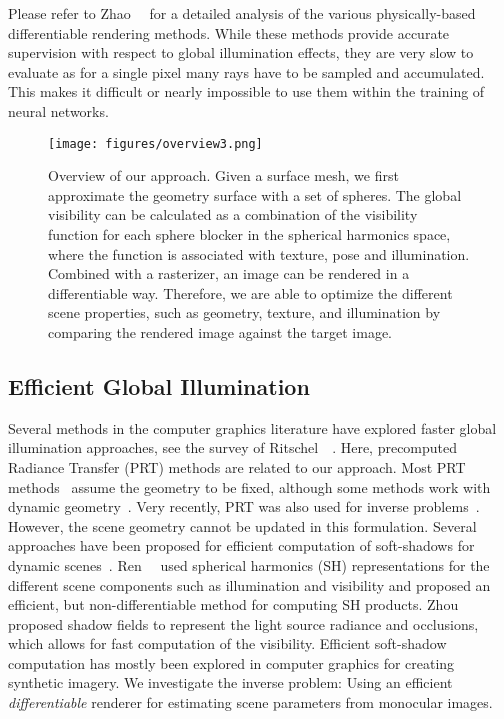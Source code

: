 %
Please refer to Zhao~\etal~\cite{pbr_tut} for a detailed analysis of the various physically-based differentiable rendering methods.
%
While these methods provide accurate supervision with respect to global illumination effects, they are very slow to evaluate as for a single pixel many rays have to be sampled and accumulated. 
%
This makes it difficult or nearly impossible to use them within the training of neural networks.
%
%
\begin{figure*}[t]
\centering
%
\texttt{[image: figures/overview3.png]} 
%
\caption
{
Overview of our approach. 
%
Given a surface mesh, we first approximate the geometry surface with a set of spheres.
%
The global visibility can be calculated as a combination of the visibility function for each sphere blocker in the spherical harmonics space, where the function is associated with texture, pose and illumination.
%
Combined with a rasterizer, an image can be rendered in a differentiable way. 
%
Therefore, we are able to optimize the different scene properties, such as geometry, texture, and illumination by comparing the rendered image against the target image.
%
}
%
\label{fig:overview}
%
\end{figure*}
%
%
\subsection{Efficient Global Illumination}
%
Several methods in the computer graphics literature have explored faster global illumination approaches, see the survey of Ritschel~\etal~\cite{ritschel2012state}.
%
Here, precomputed Radiance Transfer (PRT) methods are related to our approach. 
%
Most PRT methods~\cite{dobashi1995quick,sloan2002precomputed,kautz2002fast} assume the geometry to be fixed, although some methods work with dynamic geometry~\cite{sloan2005local,iwasaki2007precomputed}. 
%
Very recently, PRT was also used for inverse problems~\cite{thul2020precomputed}. 
%
However, the scene geometry cannot be updated in this formulation.
%
Several approaches have been proposed for efficient computation of soft-shadows for dynamic scenes~\cite{kautz2004hemispherical,zhou2005precomputed,kontkanen2005ambient}.
%
Ren~\etal ~\cite{ren2006real} used spherical harmonics (SH) representations for the different scene components such as illumination and visibility and proposed an efficient, but non-differentiable method for computing SH products.
%
Zhou ~\etal ~\cite{zhou2005precomputed} proposed shadow fields to represent the light source radiance and occlusions, which allows for fast computation of the visibility. 
%
Efficient soft-shadow computation has mostly been explored in computer graphics for creating synthetic imagery. 
%
We investigate the inverse problem: Using an efficient \emph{differentiable} renderer for estimating scene parameters from monocular images.
%